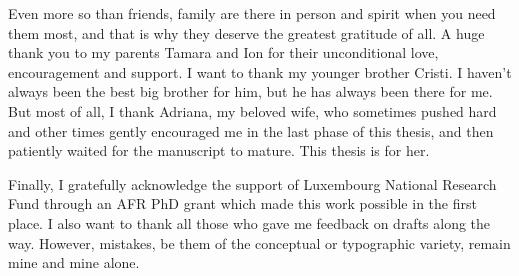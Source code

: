 \begin{acknowledgements}
Even more so than friends, family are there in person and spirit when you need them
most, and that is why they deserve the greatest gratitude of all. A huge thank you to my parents Tamara and Ion for their unconditional love, encouragement and support. I want to thank my younger brother Cristi. I haven't always been the best big brother
for him, but he has always been there for me. But most of all, I thank Adriana, my beloved wife, who sometimes pushed hard and other times gently encouraged me in the last phase of this thesis, and then patiently waited for the manuscript to mature. This thesis is for her.

Finally, I gratefully acknowledge the support of Luxembourg National Research Fund through an AFR PhD grant which made this work possible in the first place. I also want to thank all those who gave me feedback on drafts along the way. However, mistakes, be them of the conceptual or typographic variety, remain mine and mine alone. 

\end{acknowledgements}
